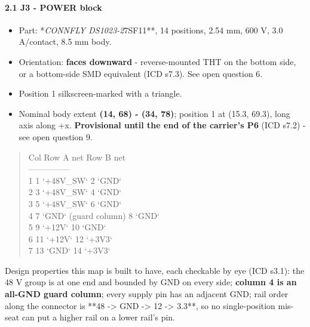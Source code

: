 \documentclass[11pt,a4paper]{article}
\begin{document}
\paragraph*{2.1 J3 - POWER block}
\begin{itemize}
\item Part: {*}\emph{CONNFLY DS1023-2}7SF11{*}{*}, 14 positions, 2.54 mm, 600 V, 3.0 A/contact, 8.5 mm body.
\item Orientation: \textbf{faces downward} - reverse-mounted THT on the bottom side, or a bottom-side
SMD equivalent (ICD s7.3). See open question 6.
\item Position 1 silkscreen-marked with a triangle.
\item Nominal body extent \textbf{(14, 68) - (34, 78)}; position 1 at (15.3, 69.3), long axis along +x.
\textbf{Provisional until the end of the carrier's P6} (ICD s7.2) - see open question 9.
\end{itemize}
\begin{quote}\small\ttfamily\raggedright
\textbar{} Col \textbar{} Row A \textbar{} net \textbar{} Row B \textbar{} net \textbar{}\\
\textbar{}---\textbar{}---\textbar{}---\textbar{}---\textbar{}---\textbar{}\\
\textbar{} 1 \textbar{} 1 \textbar{} `+48V\_SW` \textbar{} 2 \textbar{} `GND` \textbar{}\\
\textbar{} 2 \textbar{} 3 \textbar{} `+48V\_SW` \textbar{} 4 \textbar{} `GND` \textbar{}\\
\textbar{} 3 \textbar{} 5 \textbar{} `+48V\_SW` \textbar{} 6 \textbar{} `GND` \textbar{}\\
\textbar{} 4 \textbar{} 7 \textbar{} `GND` (guard column) \textbar{} 8 \textbar{} `GND` \textbar{}\\
\textbar{} 5 \textbar{} 9 \textbar{} `+12V` \textbar{} 10 \textbar{} `GND` \textbar{}\\
\textbar{} 6 \textbar{} 11 \textbar{} `+12V` \textbar{} 12 \textbar{} `+3V3` \textbar{}\\
\textbar{} 7 \textbar{} 13 \textbar{} `GND` \textbar{} 14 \textbar{} `+3V3` \textbar{}
\end{quote}
Design properties this map is built to have, each checkable by eye (ICD s3.1): the 48 V group is at one end and bounded by GND on every side; \textbf{column 4 is an all-GND guard column}; every supply pin has an adjacent GND; rail order along the connector is {*}{*}48 -\textgreater{} GND -\textgreater{} 12 -\textgreater{} 3.3{*}{*}, so no single-position mis-seat can put a higher rail on a lower rail's pin.
\end{document}
